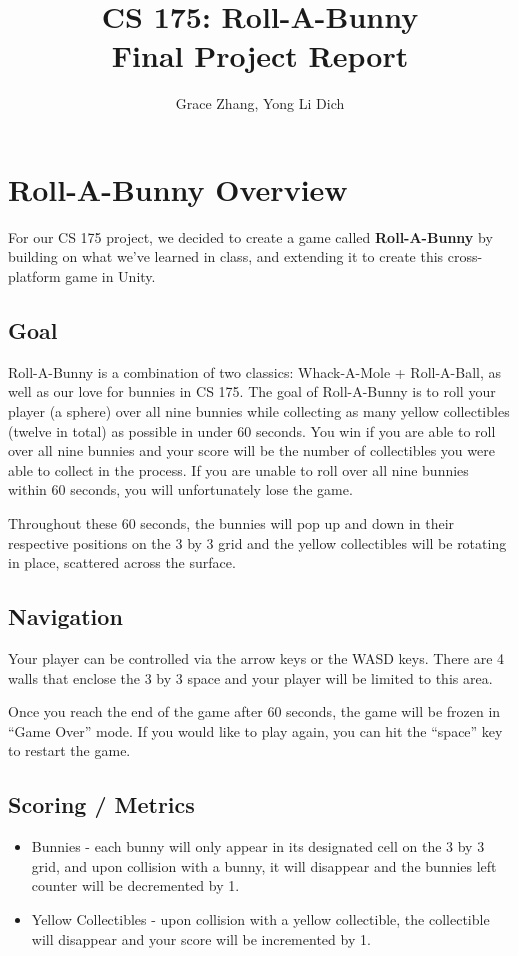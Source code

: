 \documentclass[12pt]{article}
\begin{document}
\title{%
  \textbf{CS 175: Roll-A-Bunny \\
  \large Final Project Report}}
\author{Grace Zhang, Yong Li Dich}
\date{}
\maketitle

\newpage
\tableofcontents


\newpage
 
\section{Roll-A-Bunny Overview}
  For our CS 175 project, we decided to create a game called \textbf{Roll-A-Bunny} by building on what we've learned in class, and extending it to create this cross-platform game in Unity.
\subsection{Goal}
  Roll-A-Bunny is a combination of two classics: Whack-A-Mole + Roll-A-Ball, as well as our love for bunnies in CS 175. The goal of Roll-A-Bunny is to roll your player (a sphere) over all nine bunnies while collecting as many yellow collectibles (twelve in total) as possible in under 60 seconds. 
  You win if you are able to roll over all nine bunnies and your score will be the number of collectibles you were able to collect in the process. If you are unable to roll over all nine bunnies within 60 seconds, you will unfortunately lose the game.

  Throughout these 60 seconds, the bunnies will pop up and down in their respective positions on the 3 by 3 grid and the yellow collectibles will be rotating in place, scattered across the surface. 
  
\subsection{Navigation}
  Your player can be controlled via the arrow keys or the WASD keys. 
  There are 4 walls that enclose the 3 by 3 space and your player will be limited to this area. 

  Once you reach the end of the game after 60 seconds, the game will be frozen in ``Game Over'' mode. If you would like to play again, you can hit the ``space'' key to restart the game.

\subsection{Scoring / Metrics}
\begin{itemize}
  \item Bunnies - each bunny will only appear in its designated cell on the 3 by 3 grid, and upon collision with a bunny, it will disappear and the bunnies left counter will be decremented by 1. 
  \item Yellow Collectibles - upon collision with a yellow collectible, the collectible will disappear and your score will be incremented by 1.
\end{itemize}
\end{document}
